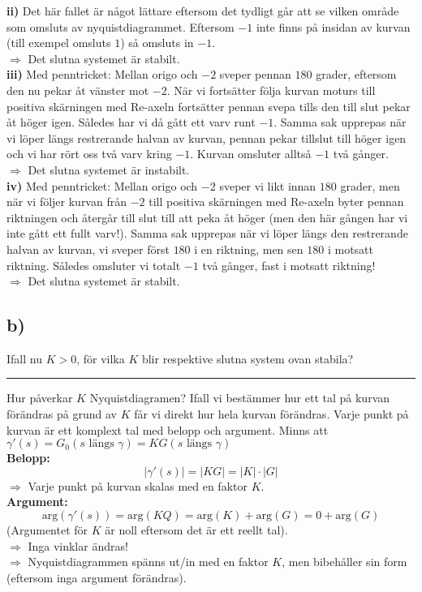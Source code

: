 \documentclass[12pt]{article}
\newcommand{\qline}{\hrule \vspace*{10pt}}
\begin{document}
\textbf{ii)} Det här fallet är något lättare eftersom det tydligt går att se vilken område som omsluts av nyquistdiagrammet. Eftersom $-1$ inte finns på insidan av kurvan (till exempel omsluts $1$) så omsluts in $-1$.\\
$\Rightarrow$ Det slutna systemet är stabilt. \\

\textbf{iii)} Med penntricket: Mellan origo och $-2$ sveper pennan $180$ grader, eftersom den nu pekar åt vänster mot $-2$. När vi fortsätter följa kurvan moturs till positiva skärningen med Re-axeln fortsätter pennan svepa tills den till slut pekar åt höger igen. Således har vi då gått ett varv runt $-1$. Samma sak upprepas när vi löper längs restrerande halvan av kurvan, pennan pekar tillslut till höger igen och vi har rört oss två varv kring $-1$. Kurvan omsluter alltså $-1$ två gånger. \\
$\Rightarrow$ Det slutna systemet är instabilt. \\

\textbf{iv)} Med penntricket: Mellan origo och $-2$ sveper vi likt innan $180$ grader, men när vi följer kurvan från $-2$ till positiva skärningen med Re-axeln byter pennan riktningen och återgår till slut till att peka åt höger (men den här gången har vi inte gått ett fullt varv!). Samma sak upprepas när vi löper längs den restrerande halvan av kurvan, vi sveper först $180$ i en riktning, men sen $180$ i motsatt riktning. Således omsluter vi totalt $-1$ två gånger, fast i motsatt riktning! \\
$\Rightarrow$ Det slutna systemet är stabilt.

\subsection*{b)}
Ifall nu $K > 0$, för vilka $K$ blir respektive slutna system ovan stabila?
\qline
Hur påverkar $K$ Nyquistdiagramen? Ifall vi bestämmer hur ett tal på kurvan förändras på grund av $K$ får vi direkt hur hela kurvan förändras. Varje punkt på kurvan är ett komplext tal med belopp och argument. Minns att $\gamma'(s) = G_0(s \text{ längs } \gamma) = KG(s \text{ längs } \gamma)$ \\
\textbf{Belopp:}
\[|\gamma'(s)| = |KG| = |K|\cdot|G|\]
$\Rightarrow$ Varje punkt på kurvan skalas med en faktor $K$. \\
\textbf{Argument:}
\[\mathrm{arg}(\gamma'(s)) = \mathrm{arg}(KQ) = \mathrm{arg}(K) + \mathrm{arg}(G) = 0 + \mathrm{arg}(G)\]
(Argumentet för $K$ är noll eftersom det är ett reellt tal). \\
$\Rightarrow$ Inga vinklar ändras! \\
$\Rightarrow$ Nyquistdiagrammen spänns ut/in med en faktor $K$, men bibehåller sin form (eftersom inga argument förändras). \\
\end{document}
